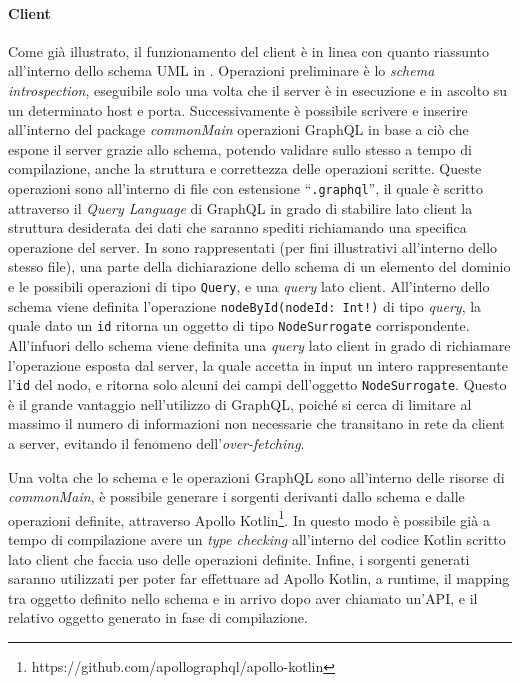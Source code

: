 \paragraph{Client}
Come già illustrato, il funzionamento del client è in linea con quanto riassunto all'interno dello schema UML in . Operazioni preliminare è lo \textit{schema introspection},
eseguibile solo una volta che il server è in esecuzione e in ascolto su un determinato host e porta. Successivamente è possibile scrivere e inserire all'interno del package \textit{commonMain}
operazioni GraphQL in base a ciò che espone il server grazie allo schema, potendo validare sullo stesso a tempo di compilazione, anche la struttura e correttezza delle operazioni scritte.
Queste operazioni sono all'interno di file con estensione ``\texttt{.graphql}'', il quale è scritto attraverso il \textit{Query Language} di GraphQL in grado di stabilire lato client
la struttura desiderata dei dati che saranno spediti richiamando una specifica operazione del server. In  sono rappresentati (per fini illustrativi all'interno dello stesso
file), una parte della dichiarazione dello schema di un elemento del dominio e le possibili operazioni di tipo \texttt{Query}, e una \textit{query} lato client.
All'interno dello schema viene definita l'operazione \texttt{nodeById(nodeId: Int!)} di tipo \textit{query}, la quale dato un \texttt{id} ritorna un oggetto di tipo \texttt{NodeSurrogate}
corrispondente. All'infuori dello schema viene definita una \textit{query} lato client in grado di richiamare l'operazione esposta dal server, la quale accetta in input un intero rappresentante
l'\texttt{id} del nodo, e ritorna solo alcuni dei campi dell'oggetto \texttt{NodeSurrogate}. Questo è il grande vantaggio nell'utilizzo di GraphQL, poiché si cerca di limitare al massimo
il numero di informazioni non necessarie che transitano in rete da client a server, evitando il fenomeno dell'\textit{over-fetching}.

Una volta che lo schema e le operazioni GraphQL sono all'interno delle risorse di \textit{commonMain}, è possibile generare i sorgenti derivanti dallo schema e dalle operazioni definite,
attraverso Apollo Kotlin\footnote{https://github.com/apollographql/apollo-kotlin}. In questo modo è possibile già a tempo di compilazione avere un \textit{type checking} all'interno del codice Kotlin scritto lato client che faccia uso delle operazioni
definite. Infine, i sorgenti generati saranno utilizzati per poter far effettuare ad Apollo Kotlin, a runtime, il mapping tra oggetto definito nello schema e in arrivo dopo aver chiamato un'\ac{API},
e il relativo oggetto generato in fase di compilazione.

